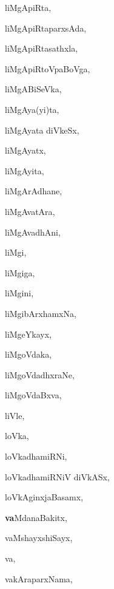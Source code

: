 \begin{multicols}{3}
{\noindent
{liMgApiRta}, \pageref{liMgApiRta}

\noindent
{liMgApiRtaparxsAda}, \pageref{liMgApiRtaparxsAda}

\noindent
{liMgApiRtasathxla}, \pageref{liMgApiRtasathxla}

\noindent
{liMgApiRtoVpaBoVga}, \pageref{liMgApiRtoVpaBoVga}

\noindent
{liMgABiSeVka}, \pageref{liMgABiSeVka}

\noindent
{liMgAya(yi)ta}, \pageref{liMgAyayita}

\noindent
{liMgAyata diVkeSx}, \pageref{liMgAyatadiVkeSx}

\noindent
{liMgAyatx}, \pageref{liMgAyatx}

\noindent
{liMgAyita}, \pageref{liMgAyita}

\noindent
{liMgArAdhane}, \pageref{liMgArAdhane}

\noindent
{liMgAvatAra}, \pageref{liMgAvatAra}

\noindent
{liMgAvadhAni}, \pageref{liMgAvadhAni}

\noindent
{liMgi}, \pageref{liMgi}

\noindent
{liMgiga}, \pageref{liMgiga}

\noindent
{liMgini}, \pageref{liMgini}

\noindent
{liMgibArxhamxNa}, \pageref{liMgibArxhamxNa}

\noindent
{liMgeYkayx}, \pageref{liMgeYkayx}

\noindent
{liMgoVdaka}, \pageref{liMgoVdaka}

\noindent
{liMgoVdadhxraNe}, \pageref{liMgoVdadhxraNe}

\noindent
{liMgoVdaBxva}, \pageref{liMgoVdaBxva}

\noindent
{liVle}, \pageref{liVle}

\noindent
{loVka}, \pageref{loVka}

\noindent
{loVkadhamiRNi}, \pageref{loVkadhamiRNi}

\noindent
{loVkadhamiRNiV diVkASx}, \pageref{loVkadhamiRNiVdiVkASx}

\noindent
{loVkAginxjaBasamx}, \pageref{loVkAginxjaBasamx}

\noindent
{{\large\textbf{va}}MdanaBakitx}, \pageref{vaMdanaBakitx}

\noindent
{vaMshayxshiSayx}, \pageref{vaMshayxshiSayx}

\noindent
{va}, \pageref{va}

\noindent
{vakAraparxNama}, \pageref{vakAraparxNama}

}
\end{multicols}
